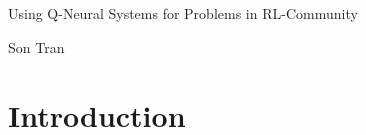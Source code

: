 \documentclass{article}
\begin{document}
\begin{center}
{\large 
  Using Q-Neural Systems for Problems in RL-Community
}

Son Tran
\end{center}

\section{Introduction}
\end{document}

